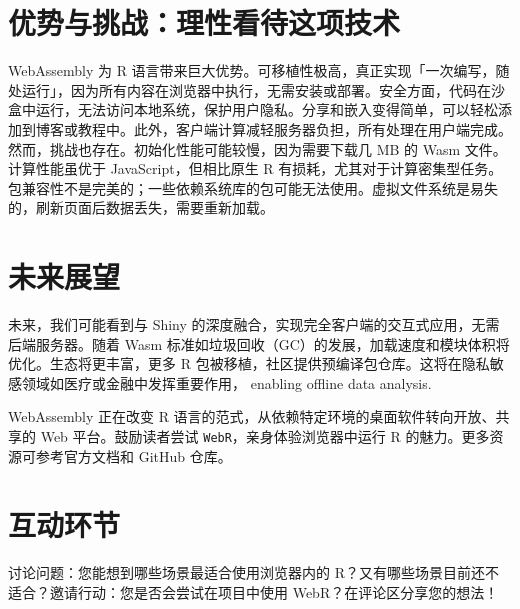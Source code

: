 \chapter{优势与挑战：理性看待这项技术}
WebAssembly 为 R 语言带来巨大优势。可移植性极高，真正实现「一次编写，随处运行」，因为所有内容在浏览器中执行，无需安装或部署。安全方面，代码在沙盒中运行，无法访问本地系统，保护用户隐私。分享和嵌入变得简单，可以轻松添加到博客或教程中。此外，客户端计算减轻服务器负担，所有处理在用户端完成。然而，挑战也存在。初始化性能可能较慢，因为需要下载几 MB 的 Wasm 文件。计算性能虽优于 JavaScript，但相比原生 R 有损耗，尤其对于计算密集型任务。包兼容性不是完美的；一些依赖系统库的包可能无法使用。虚拟文件系统是易失的，刷新页面后数据丢失，需要重新加载。\par
\chapter{未来展望}
未来，我们可能看到与 Shiny 的深度融合，实现完全客户端的交互式应用，无需后端服务器。随着 Wasm 标准如垃圾回收（GC）的发展，加载速度和模块体积将优化。生态将更丰富，更多 R 包被移植，社区提供预编译包仓库。这将在隐私敏感领域如医疗或金融中发挥重要作用， enabling offline data analysis.\par
WebAssembly 正在改变 R 语言的范式，从依赖特定环境的桌面软件转向开放、共享的 Web 平台。鼓励读者尝试 \texttt{WebR}，亲身体验浏览器中运行 R 的魅力。更多资源可参考官方文档和 GitHub 仓库。\par
\chapter{互动环节}
讨论问题：您能想到哪些场景最适合使用浏览器内的 R？又有哪些场景目前还不适合？邀请行动：您是否会尝试在项目中使用 WebR？在评论区分享您的想法！\par

